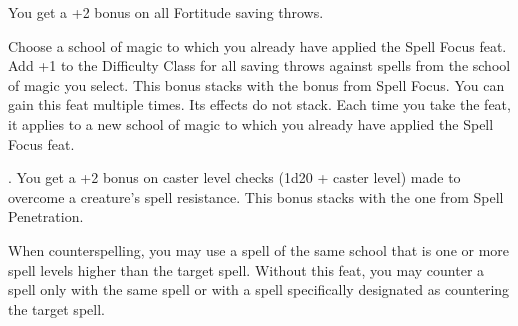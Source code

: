 {You get a +2 bonus on all Fortitude saving throws.}

{Choose a school of magic to which you already have applied the Spell Focus feat.}
{Add +1 to the Difficulty Class for all saving throws against spells from the school of magic you select. This bonus stacks with the bonus from Spell Focus.}{}
{You can gain this feat multiple times. Its effects do not stack. Each time you take the feat, it applies to a new school of magic to which you already have applied the Spell Focus feat.}{}

{.}
{You get a +2 bonus on caster level checks (1d20 + caster level) made to overcome a creature's spell resistance. This bonus stacks with the one from Spell Penetration.}

{When counterspelling, you may use a spell of the same school that is one or more spell levels higher than the target spell.}
{Without this feat, you may counter a spell only with the same spell or with a spell specifically designated as countering the target spell.}{}

